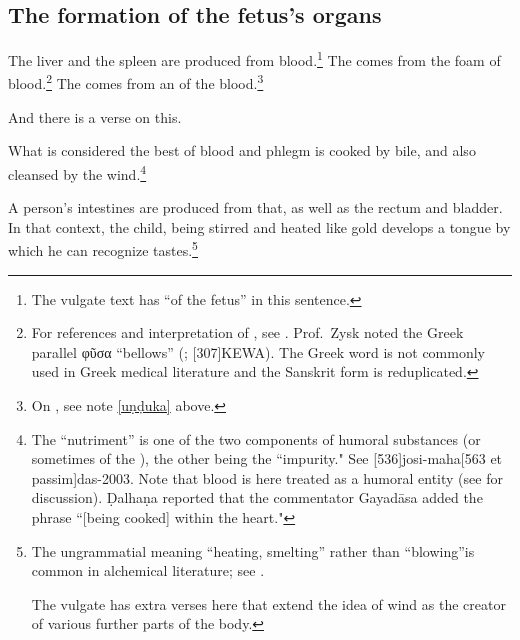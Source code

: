 \begin{translation}
\subsection{The formation of the fetus's organs}

\item[25]

The liver and the spleen are produced from blood.\footnote{The vulgate
    text has  “of the fetus” in this sentence.}  The
     comes from the foam of blood.\footnote{For
        references and interpretation of , see \cite[271,
        n.\,23, 276, n.\,31]{wuja-2003}.  Prof.\ Zysk noted the Greek parallel
        \textgreek{φῦσα} “bellows” (\cite[1700a]{lidd-1901};
        [307]{KEWA}).  The Greek word is not commonly used in Greek
        medical literature and the Sanskrit form is reduplicated.}  The
         comes from an  of
        the blood.\footnote{On , see note \ref{uṇḍuka} above.}
        
\item[26]
And there is a verse on this.
\begin{sloka}    
What is considered the best  of blood and
phlegm is cooked by bile, and also cleansed by the wind.\footnote{The
     “nutriment” is one of the two components of humoral
    substances (or sometimes of the ), the other
    being the  “impurity."  See
    [536]{josi-maha}{}[563 et passim]{das-2003}. Note that
    blood is here treated as a humoral entity (see \cite{meul-1991} for
    discussion). %
    Ḍalhaṇa reported that the commentator Gayadāsa added the phrase
    “[being cooked] within the heart."}
\end{sloka}

\item[27--28]
\begin{sloka}
A person's intestines are produced from that, as well as the rectum
and bladder. In that context, the child, being stirred and heated like
gold develops a tongue by which he can recognize tastes.\footnote{The
    ungrammatial  meaning “heating, smelting” rather than
    “blowing”is common in alchemical literature; see
    \cites[passim]{hell-2009}[327, n.\,11]{wujad-2025}.
    
    The vulgate has extra verses here that extend the idea of wind
    as the creator of various further parts of the body.} %
\end{sloka}
        

\end{translation}
